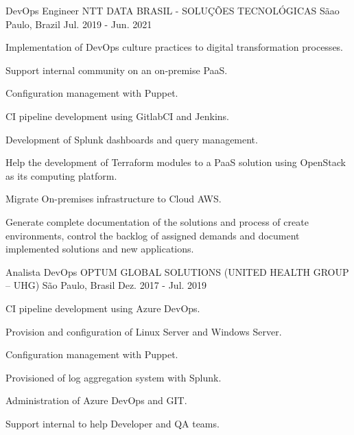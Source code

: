 \begin{cventries}
  \cventry
    {DevOps Engineer} %
    {NTT DATA BRASIL - SOLUÇÕES TECNOLÓGICAS} %
    {Sãao Paulo, Brazil} %
    {Jul. 2019 - Jun. 2021} %
    {
      \begin{cvitems} %
        \item {Implementation of DevOps culture practices to digital transformation processes.}
        \item {Support internal community on an on‑premise PaaS.}
        \item {Configuration management with Puppet.}
        \item {CI pipeline development using GitlabCI and Jenkins.}
        \item {Development of Splunk dashboards and query management.}
        \item {Help the development of Terraform modules to a PaaS solution using OpenStack as its computing platform.}
        \item {Migrate On-premises infrastructure to Cloud AWS.}
        \item {Generate complete documentation of the solutions and process of create environments, control the backlog of assigned demands and document implemented solutions and new applications.}
      \end{cvitems}
    }
\break

  \cventry
    {Analista DevOps} %
    {OPTUM GLOBAL SOLUTIONS (UNITED HEALTH GROUP – UHG)} %
    {São Paulo, Brasil} %
    {Dez. 2017 - Jul. 2019} %
    {
      \begin{cvitems} %
        \item {CI pipeline development using Azure DevOps.}
        \item {Provision and configuration of Linux Server and Windows Server.}
        \item {Configuration management with Puppet.}
        \item {Provisioned of log aggregation system with Splunk.}
        \item {Administration of Azure DevOps and GIT.}
        \item {Support internal to help Developer and QA teams.}
      \end{cvitems}
    }


\end{cventries}